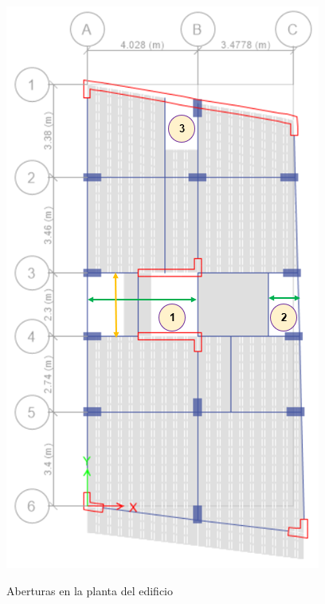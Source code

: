 \begin{figure}[h!]
    \centering
    \caption{Aberturas en la planta del edificio}
    \includegraphics[scale=1]{IMAGENES/17.PNG}
    \label{fig:my_label}
\end{figure}

